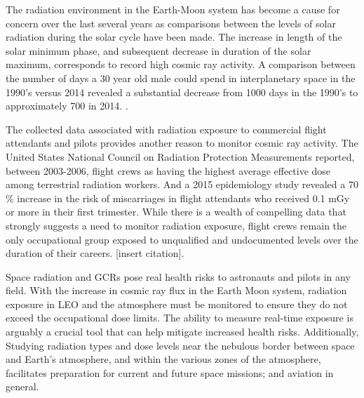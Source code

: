 


The radiation environment in the Earth-Moon system has become a cause for concern over the last several years as comparisons between the levels of solar radiation during the solar cycle have been made. The increase in length of the solar minimum phase, and subsequent decrease in duration of the solar maximum, corresponds to record high cosmic ray activity.  A comparison between the number of days a 30 year old male could spend in interplanetary space in the 1990's versus 2014 revealed a substantial decrease from 1000 days in the 1990's to approximately 700 in 2014. \cite{hathaway}.

The collected data associated with radiation exposure to commercial flight attendants and pilots provides another reason to monitor cosmic ray activity.  The United States National Council on Radiation Protection Measurements reported, between 2003-2006, flight crews as having the highest average effective dose among terrestrial radiation workers.  And a 2015 epidemiology study revealed a 70 \% increase in the risk of miscarriages in flight attendants who received 0.1 mGy or more in their first trimester.  While there is a wealth of compelling data that strongly suggests a need to monitor radiation exposure, flight crews remain the only occupational group exposed to unqualified and undocumented levels over the duration of their careers. [insert citation].     

Space radiation and GCRs pose real health risks to astronauts and  pilots in any field.  With the increase in cosmic ray flux in the Earth Moon system, radiation exposure in LEO and the atmosphere must be monitored to ensure they do not exceed the occupational dose limits.  The ability to measure real-time exposure is arguably a crucial tool that can help mitigate increased health risks.  Additionally, Studying radiation types and dose levels near the nebulous border between space and Earth's atmosphere, and within the various zones of the atmosphere, facilitates preparation for current and future space missions; and aviation in general. 

%



